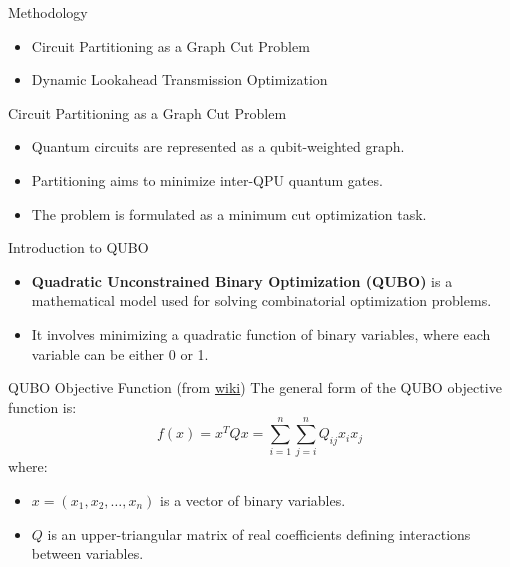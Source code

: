 \documentclass{beamer}
\begin{document}
	\begin{frame}{Methodology}
		\begin{itemize}
			\item Circuit Partitioning as a Graph Cut Problem
			\item Dynamic Lookahead Transmission Optimization
		\end{itemize}
	\end{frame}
	\begin{frame}{Circuit Partitioning as a Graph Cut Problem}
		\begin{itemize}
			\item Quantum circuits are represented as a qubit-weighted graph.
			\item Partitioning aims to minimize inter-QPU quantum gates.
			\item The problem is formulated as a minimum cut optimization task.
		\end{itemize}
	\end{frame}
	
	\begin{frame}{Introduction to QUBO}
		\begin{itemize}
			\item \textbf{Quadratic Unconstrained Binary Optimization (QUBO)} is a mathematical model used for solving combinatorial optimization problems.
			\item It involves minimizing a quadratic function of binary variables, where each variable can be either 0 or 1.
		\end{itemize}
	\end{frame}
	
	\begin{frame}{QUBO Objective Function (from \href{https://en.wikipedia.org/wiki/Quadratic_unconstrained_binary_optimization}{wiki})}
		The general form of the QUBO objective function is:
		\[
		f(x) = x^{T} Q x = \sum_{i=1}^n \sum_{j=i}^n Q_{ij} x_i x_j
		\]
		where:
		\begin{itemize}
			\item \( x = (x_1, x_2, \ldots, x_n) \) is a vector of binary variables.
			\item \( Q \) is an upper-triangular matrix of real coefficients defining interactions between variables.
		\end{itemize}
	\end{frame}
	
\end{document}
